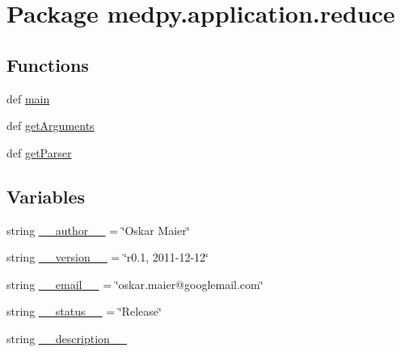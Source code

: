 \hypertarget{namespacemedpy_1_1application_1_1reduce}{
\section{Package medpy.application.reduce}
\label{namespacemedpy_1_1application_1_1reduce}
}
\subsection*{Functions}
\begin{DoxyCompactItemize}
\item 
def \hyperlink{namespacemedpy_1_1application_1_1reduce_a7e0c49b9b6c76dff130254b74b711ad4}{main}
\item 
def \hyperlink{namespacemedpy_1_1application_1_1reduce_ae1fd96e420b1f137f634bf73e95f1f4f}{getArguments}
\item 
def \hyperlink{namespacemedpy_1_1application_1_1reduce_a38e2b16d7f616b7725191a3f7424d9e9}{getParser}
\end{DoxyCompactItemize}
\subsection*{Variables}
\begin{DoxyCompactItemize}
\item 
string \hyperlink{namespacemedpy_1_1application_1_1reduce_a9ae41e540d9256bf2d38f70707610645}{\_\-\_\-author\_\-\_\-} = \char`\"{}Oskar Maier\char`\"{}
\item 
string \hyperlink{namespacemedpy_1_1application_1_1reduce_ab7d6b705d72b2bf03b8fc06d12d57d1c}{\_\-\_\-version\_\-\_\-} = \char`\"{}r0.1, 2011-\/12-\/12\char`\"{}
\item 
string \hyperlink{namespacemedpy_1_1application_1_1reduce_a5bc4e8875071312e12c147d607a1cb2f}{\_\-\_\-email\_\-\_\-} = \char`\"{}oskar.maier@googlemail.com\char`\"{}
\item 
string \hyperlink{namespacemedpy_1_1application_1_1reduce_afb819b48190291c426350672a1466ce7}{\_\-\_\-status\_\-\_\-} = \char`\"{}Release\char`\"{}
\item 
string \hyperlink{namespacemedpy_1_1application_1_1reduce_ae797a4fab76411403ac07aa369504edd}{\_\-\_\-description\_\-\_\-}
\end{DoxyCompactItemize}


